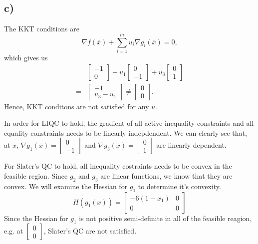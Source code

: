 \documentclass{article}
\begin{document}
\subsection*{c)}
	The KKT conditions are
	\begin{equation}
		\nabla f(\bar{x}) + \sum_{i=1}^{m} u_i \nabla g_i(\bar{x}) = 0,
	\end{equation}
	which gives us 
	\begin{align}
		&  \begin{bmatrix} -1 \\ 0 \end{bmatrix} + u_1 \begin{bmatrix} 0 \\ -1 \end{bmatrix} + u_3 \begin{bmatrix} 0 \\ 1 \end{bmatrix} \\
		= & \begin{bmatrix}-1 \\ u_3 - u_1 \end{bmatrix} \neq \begin{bmatrix}0 \\ 0 \end{bmatrix}.
	\end{align}
	Hence, KKT conditons are not satisfied for any $u$.
	
	In order for LIQC to hold, the gradient of all active inequality constraints and all equality constraints needs to be linearly indepdendent. We can clearly see that, at $\bar{x}$, $\nabla g_1(\bar{x}) = \begin{bmatrix} 0 \\ -1 \end{bmatrix}$ and  $\nabla g_3(\bar{x}) = \begin{bmatrix} 0 \\ 1 \end{bmatrix}$ are linearly dependent. 
	
	For Slater's QC to hold, all inequality costraints needs to be convex in the feasible region. Since $g_2$ and $g_3$ are linear functions, we know that they are convex. We will examine the Hessian for $g_1$ to determine it's convexity. 
	\begin{equation}
		H(g_1(x)) = \begin{bmatrix}
			-6(1-x_1) & 0 \\ 0 & 0
		\end{bmatrix}
	\end{equation}
	Since the Hessian for $g_1$ is not positive semi-definite in all of the feasible reagion, e.g. at $\begin{bmatrix} 0\\0	\end{bmatrix}$, Slater's QC are not satisfied.
\end{document}
